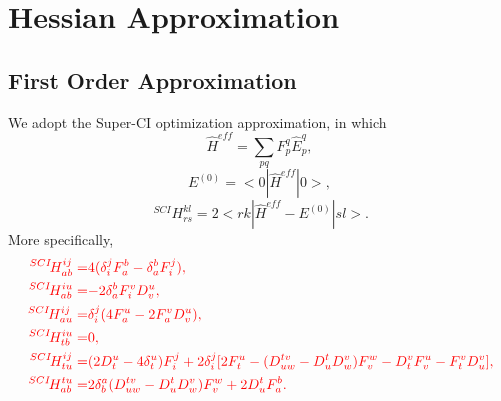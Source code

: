 \documentclass[a4paper,12pt,oneside]{book}
\newcommand{\red}[1]{{\color{red} #1}}
\newcommand{\pre}[1]{\,#1\!}
\begin{document}
\section{Hessian Approximation}

\subsection{First Order Approximation}
We adopt the Super-CI optimization approximation\cite{SCI1989}, in which 
\begin{equation}
\hat{H}^{eff}=\sum_{pq}F_p^q \hat{E}_p^q,
\end{equation}
\begin{equation}
E^{(0)}=<0|\hat{H}^{eff}|0>,
\end{equation}
\begin{equation}
\pre{^{SCI}}H_{rs}^{kl}=2<rk|\hat{H}^{eff} - E^{(0)}|sl>.
\end{equation}
More specifically,
\begin{equation}
\begin{aligned}
  \red{\pre{^{SCI}}H_{ab}^{ij} =}&\red{ 4(\delta_i^j F_a^b-\delta_a^b F_i^j),}\\
  \red{\pre{^{SCI}}H_{ab}^{iu} =}&\red{ -2\delta_a^b F_i^vD_v^u,} \\
  \red{\pre{^{SCI}}H_{au}^{ij} =}&\red{ \delta_i^j(4F_a^u-2F_a^vD_v^u), }\\
  \red{\pre{^{SCI}}H_{tb}^{iu} =}&\red{ 0,}\\
  \red{\pre{^{SCI}}H_{tu}^{ij} =}&\red{ (2D_t^u-4\delta_t^u) F_i^j+2\delta_i^j[2F_t^u-(D^{tv}_{uw}-D^t_uD^v_w)F_v^w-D_t^vF_v^u-F_t^vD^v_u],}\\
  \red{\pre{^{SCI}}H_{ab}^{tu} =}&\red{ 2\delta^a_b (D^{tv}_{uw}-D^t_uD^v_w)F_v^w + 2D^t_uF_a^b.}
\end{aligned}
\end{equation}
\end{document}
